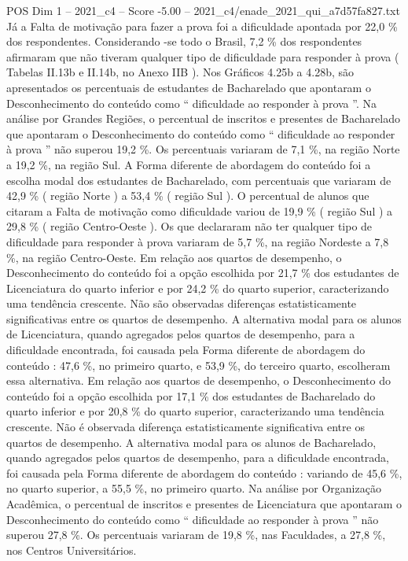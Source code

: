 \begin{textsample}{POS Dim 1 – 2021\_c4 – Score -5.00 – 2021\_c4/enade\_2021\_qui\_a7d57fa827.txt}
Já a Falta de motivação para fazer a prova foi a dificuldade apontada por 22,0 \% dos respondentes.
Considerando -se todo o Brasil, 7,2 \% dos respondentes afirmaram que não tiveram qualquer tipo de dificuldade para responder à prova ( Tabelas II.13b e II.14b, no Anexo IIB ).
Nos Gráficos 4.25b a 4.28b, são apresentados os percentuais de estudantes de Bacharelado que apontaram o Desconhecimento do conteúdo como “ dificuldade ao responder à prova ”.
Na análise por Grandes Regiões, o percentual de inscritos e presentes de Bacharelado que apontaram o Desconhecimento do conteúdo como “ dificuldade ao responder à prova ” não superou 19,2 \%.
Os percentuais variaram de 7,1 \%, na região Norte a 19,2 \%, na região Sul.
A Forma diferente de abordagem do conteúdo foi a escolha modal dos estudantes de Bacharelado, com percentuais que variaram de 42,9 \% ( região Norte ) a 53,4 \% ( região Sul ).
O percentual de alunos que citaram a Falta de motivação como dificuldade variou de 19,9 \% ( região Sul ) a 29,8 \% ( região Centro-Oeste ).
Os que declararam não ter qualquer tipo de dificuldade para responder à prova variaram de 5,7 \%, na região Nordeste a 7,8 \%, na região Centro-Oeste.
Em relação aos quartos de desempenho, o Desconhecimento do conteúdo foi a opção escolhida por 21,7 \% dos estudantes de Licenciatura do quarto inferior e por 24,2 \% do quarto superior, caracterizando uma tendência crescente.
Não são observadas diferenças estatisticamente significativas entre os quartos de desempenho.
A alternativa modal para os alunos de Licenciatura, quando agregados pelos quartos de desempenho, para a dificuldade encontrada, foi causada pela Forma diferente de abordagem do conteúdo : 47,6 \%, no primeiro quarto, e 53,9 \%, do terceiro quarto, escolheram essa alternativa.
Em relação aos quartos de desempenho, o Desconhecimento do conteúdo foi a opção escolhida por 17,1 \% dos estudantes de Bacharelado do quarto inferior e por 20,8 \% do quarto superior, caracterizando uma tendência crescente.
Não é observada diferença estatisticamente significativa entre os quartos de desempenho.
A alternativa modal para os alunos de Bacharelado, quando agregados pelos quartos de desempenho, para a dificuldade encontrada, foi causada pela Forma diferente de abordagem do conteúdo : variando de 45,6 \%, no quarto superior, a 55,5 \%, no primeiro quarto.
Na análise por Organização Acadêmica, o percentual de inscritos e presentes de Licenciatura que apontaram o Desconhecimento do conteúdo como “ dificuldade ao responder à prova ” não superou 27,8 \%.
Os percentuais variaram de 19,8 \%, nas Faculdades, a 27,8 \%, nos Centros Universitários.

\end{textsample}
